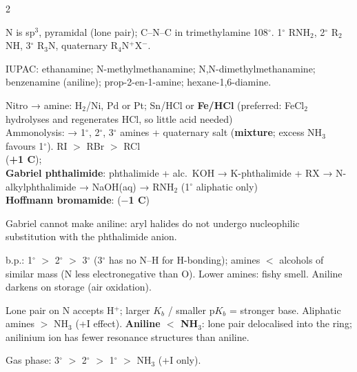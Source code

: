 \documentclass[9pt,a4paper]{extarticle}
\newcommand{\nr}[1]{\textbf{\color{uc!85!black}#1}}
\begin{document}
\begin{multicols}{2}
\begin{fl}
\item N is sp$^3$, pyramidal (lone pair); C--N--C in trimethylamine 108$^\circ$. 1$^\circ$ RNH$_2$, 2$^\circ$ R$_2$NH, 3$^\circ$ R$_3$N, quaternary R$_4$N$^+$X$^-$.
\item IUPAC: ethanamine; N-methylmethanamine; N,N-dimethylmethanamine; benzenamine (aniline); prop-2-en-1-amine; hexane-1,6-diamine.
\end{fl}
\begin{kbox}
Nitro → amine: H$_2$/Ni, Pd or Pt; Sn/HCl or \textbf{Fe/HCl} (preferred: FeCl$_2$ hydrolyses and regenerates HCl, so little acid needed)\\
Ammonolysis:   → 1$^\circ$, 2$^\circ$, 3$^\circ$ amines + quaternary salt (\textbf{mixture}; excess NH$_3$ favours 1$^\circ$). RI $>$ RBr $>$ RCl\\
 (\textbf{+1 C});\quad {}\\
\nr{Gabriel phthalimide}: phthalimide + alc.\ KOH → K-phthalimide + RX → N-alkylphthalimide → NaOH(aq) → RNH$_2$ (1$^\circ$ aliphatic only)\\
\nr{Hoffmann bromamide}:  (\textbf{$-$1 C})
\end{kbox}
\begin{fl}
\item Gabriel cannot make aniline: aryl halides do not undergo nucleophilic substitution with the phthalimide anion.
\item b.p.: 1$^\circ$ $>$ 2$^\circ$ $>$ 3$^\circ$ (3$^\circ$ has no N--H for H-bonding); amines $<$ alcohols of similar mass (N less electronegative than O). Lower amines: fishy smell. Aniline darkens on storage (air oxidation).
\end{fl}
\begin{fl}
\item Lone pair on N accepts H$^+$; larger $K_b$ / smaller p$K_b$ = stronger base. Aliphatic amines $>$ NH$_3$ (+I effect). \textbf{Aniline $<$ NH$_3$}: lone pair delocalised into the ring; anilinium ion has fewer resonance structures than aniline.
\item Gas phase: 3$^\circ$ $>$ 2$^\circ$ $>$ 1$^\circ$ $>$ NH$_3$ (+I only).

\end{fl}
\end{multicols}
\end{document}
